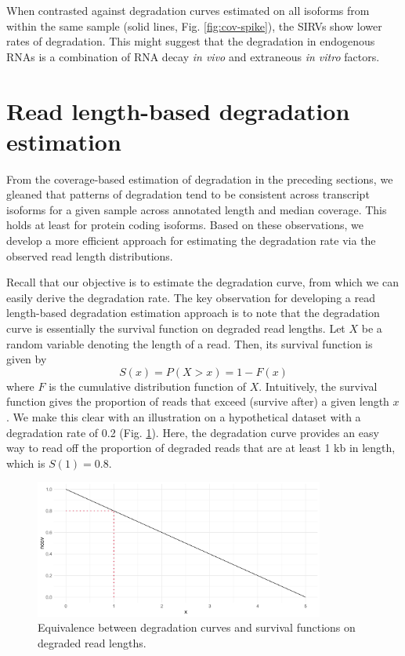 When contrasted against degradation curves estimated on all isoforms from within the same sample (solid lines, Fig. \ref{fig:cov-spike}), the SIRVs show lower rates of degradation. This might suggest that the degradation in endogenous RNAs is a combination of RNA decay \textit{in vivo} and extraneous \textit{in vitro} factors. 

\section{Read length-based degradation estimation}\label{sec:rld}

From the coverage-based estimation of degradation in the preceding sections, we gleaned that patterns of degradation tend to be consistent across transcript isoforms for a given sample across annotated length and median coverage. This holds at least for protein coding isoforms. Based on these observations, we develop a more efficient approach for estimating the degradation rate via the observed read length distributions.

Recall that our objective is to estimate the degradation curve, from which we can easily derive the degradation rate. The key observation for developing a read length-based degradation estimation approach is to note that the degradation curve is essentially the survival function on degraded read lengths. Let $X$ be a random variable denoting the length of a read. Then, its survival function is given by 
\begin{equation}
    S(x)=P(X>x)=1-F(x)
\end{equation}
where $F$ is the cumulative distribution function of $X$. Intuitively, the survival function gives the proportion of reads that exceed (survive after) a given length $x$. We make this clear with an illustration on a hypothetical dataset with a degradation rate of 0.2 (Fig. \ref{fig:survival}). Here, the degradation curve provides an easy way to read off the proportion of degraded reads that are at least 1 kb in length, which is $S(1)=0.8$.   

\begin{figure}[H]
    \centering
    \includegraphics[width=0.85\textwidth]{figures/sec-2-length-example.png}
    \caption[Equivalence between degradation curves and survival functions]{Equivalence between degradation curves and survival functions on degraded read lengths.}
    \label{fig:survival}
\end{figure}

